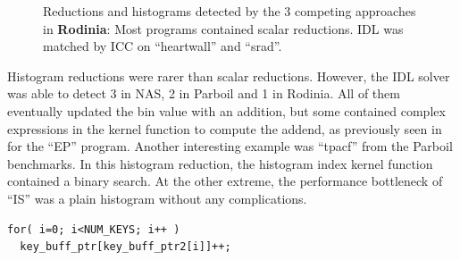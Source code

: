 \begin{figure}[p]
  \caption{Reductions and histograms detected by the 3 competing approaches
           in {\bf Rodinia}:
           Most programs contained scalar reductions.
           IDL was matched by ICC on ``heartwall'' and ``srad''.}
    \label{rodinia_spotted}
\end{figure}

    Histogram reductions were rarer than scalar reductions.
    However, the IDL solver was able to detect 3 in NAS, 2 in Parboil and 1 in
    Rodinia.
    All of them eventually updated the bin value with an addition, but some
    contained complex expressions in the kernel function to compute the addend,
    as previously seen in  for the ``EP''
    program.
    Another interesting example was ``tpacf'' from the Parboil benchmarks.
    In this histogram reduction, the histogram index kernel function contained a
    binary search.
    At the other extreme, the performance bottleneck of ``IS'' was a plain
    histogram without any complications.
\begin{lstlisting}[language=MyCpp]
for( i=0; i<NUM_KEYS; i++ )
  key_buff_ptr[key_buff_ptr2[i]]++;
\end{lstlisting}

